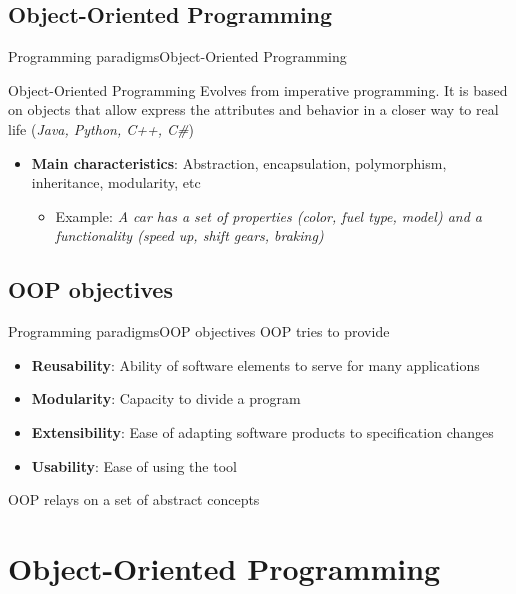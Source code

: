 \documentclass[10pt,compress]{beamer} %
\begin{document}
\subsection{Object-Oriented Programming}

\begin{frame}{Programming paradigms}{Object-Oriented Programming}
	\begin{block}{Object-Oriented Programming}
		Evolves from imperative programming. It is based on \alert{objects} that allow express the \alert{attributes} and \alert{behavior} in a closer way to real life (\textit{Java, Python, C++, C\#})
  	\end{block}
  	\begin{itemize}
  		\item \textbf{Main characteristics}: Abstraction, encapsulation, polymorphism, inheritance, modularity, etc
        \begin{itemize}
		\item Example: \textit{A car has a set of properties (color, fuel type, model) and a functionality (speed up, shift gears, braking)} 
        \end{itemize}
  	\end{itemize}
\end{frame}

\subsection{OOP objectives}

\begin{frame}{Programming paradigms}{OOP objectives}
OOP tries to provide
\begin{itemize}
  	\item \textbf{Reusability}: Ability of software elements to serve for many applications
	\item \textbf{Modularity}: Capacity to divide a program
  	\item \textbf{Extensibility}: Ease of adapting software products to specification changes
  	\item \textbf{Usability}: Ease of using the tool
\end{itemize} 	
OOP relays on a set of abstract concepts
\end{frame}


\section[Object-Oriented Programming]{Object-Oriented Programming}
\end{document}
